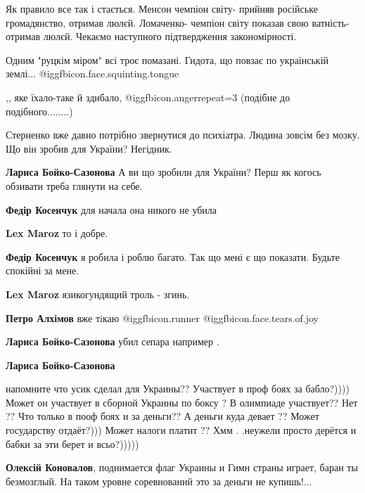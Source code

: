 \begin{itemize}
Як правило все так і стається. Менсон чемпіон світу- прийняв російське громадянство, отримав люлєй. Ломаченко- чемпіон світу показав свою ватність- отримав люлєй. Чекаємо наступного підтвердження закономірності.

Одним "руцкім міром" всі троє помазані. Гидота, що повзає по українській землі... @igg{fbicon.face.squinting.tongue} 

,, яке їхало-таке й здибало, @igg{fbicon.anger}{repeat=3} (подібне до подібного........)

Стерненко вже давно потрібно звернутися до психіатра. Людина зовсім без мозку. Що він зробив для України? Негідник.

\begin{itemize} %
\textbf{Лариса Бойко-Сазонова} А ви що зробили для України? Перш як когось обзивати треба глянути на себе.

\begin{itemize} %
\textbf{Федір Косенчук} для начала она никого не убила

\textbf{Lex Maroz} то і добре.

\textbf{Федір Косенчук} я робила і роблю багато. Так що мені є що показати. Будьте спокійні за мене.

\textbf{Lex Maroz} язикогундящий троль - згинь.

\textbf{Петро Алхімов} вже тiкаю  @igg{fbicon.runner}  @igg{fbicon.face.tears.of.joy} 
\end{itemize} %

\textbf{Лариса Бойко-Сазонова} убил сепара например .

\textbf{Лариса Бойко-Сазонова} 

напомните что усик сделал для Украины??
Участвует в проф боях за бабло?)))) Может он участвует в сборной Украины по
боксу ? В олимпиаде участвует?? Нет ?? Что только в пооф боях и за деньги?? А
деньги куда девает ?? Может государству отдаёт?))) Может налоги платит ?? Хмм .
.неужели просто дерётся и бабки за эти берет и всьо?)))))

\begin{itemize} %
\textbf{Олексій Коновалов}, поднимается флаг Украины и Гимн страны играет, баран ты безмозглый. На таком уровне соревнований это за деньги не купишь!...


\end{itemize}
\end{itemize}
\end{itemize}
